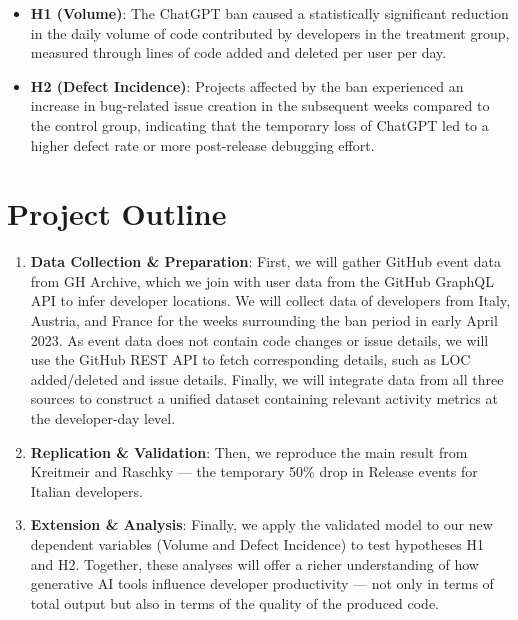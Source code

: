 \begin{itemize}
  \item \textbf{H1 (Volume)}: The ChatGPT ban caused a statistically significant reduction in the daily volume of code contributed by developers in the treatment group, measured through lines of code added and deleted per user per day.
  \item \textbf{H2 (Defect Incidence)}: Projects affected by the ban experienced an increase in bug-related issue creation in the subsequent weeks compared to the control group, indicating that the temporary loss of ChatGPT led to a higher defect rate or more post-release debugging effort.
\end{itemize}


\section*{Project Outline}



\begin{enumerate}
  \item \textbf{Data Collection \& Preparation}: First, we will gather GitHub event data from GH Archive, which we join with user data from the GitHub GraphQL API to infer developer locations. We will collect data of developers from Italy, Austria, and France for the weeks surrounding the ban period in early April 2023. As event data does not contain code changes or issue details, we will use the GitHub REST API \cite{github_api} to fetch corresponding details, such as LOC added/deleted and issue details. Finally, we will integrate data from all three sources to construct a unified dataset containing relevant activity metrics at the developer-day level.
  \item \textbf{Replication \& Validation}: Then, we reproduce the main result from Kreitmeir and Raschky — the temporary 50\% drop in Release events for Italian developers.
  \item \textbf{Extension \& Analysis}: Finally, we apply the validated model to our new dependent variables (Volume and Defect Incidence) to test hypotheses H1 and H2. Together, these analyses will offer a richer understanding of how generative AI tools influence developer productivity — not only in terms of total output but also in terms of the quality of the produced code.
\end{enumerate}
